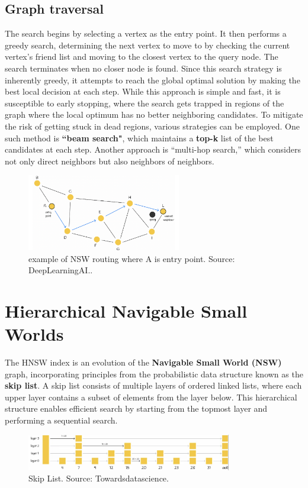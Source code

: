 \subsection{Graph traversal}
The search begins by selecting a vertex as the entry point. It then performs a greedy search, determining the next vertex to move to by checking the current vertex’s friend list and moving to the closest vertex to the query node. The search terminates when no closer node is found.  
Since this search strategy is inherently greedy, it attempts to reach the global optimal solution by making the best local decision at each step. While this approach is simple and fast, it is susceptible to early stopping, where the search gets trapped in regions of the graph where the local optimum has no better neighboring candidates.  
To mitigate the risk of getting stuck in dead regions, various strategies can be employed. One such method is \textbf{“beam search"}, which maintains a \textbf{top-k} list of the best candidates at each step. Another approach is “multi-hop search,” which considers not only direct neighbors but also neighbors of neighbors.
\begin{figure}[h]
    \centering
\includegraphics[width=0.6\textwidth]{IMAGES/immagine_2025-02-27_132919654.png}
    \caption[NSW routing]{example of NSW routing where A is entry point. Source: DeepLearningAI.\footnotemark.}
    \label{fig:NSW traversal}
\end{figure}

\section{Hierarchical Navigable Small Worlds}
The HNSW index is an evolution of the \textbf{Navigable Small World (NSW)} graph, incorporating principles from the probabilistic data structure known as the \textbf{skip list}. A skip list consists of multiple layers of ordered linked lists, where each upper layer contains a subset of elements from the layer below. This hierarchical structure enables efficient search by starting from the topmost layer and performing a sequential search.  
\begin{figure}[h]
    \centering
\includegraphics[width=0.8\textwidth]{IMAGES/immagine_2025-02-27_133448847.png}
    \caption[Skip List]{Skip List. Source: Towardsdatascience.\footnotemark[2]}
    \label{fig:Skip List}
\end{figure}

